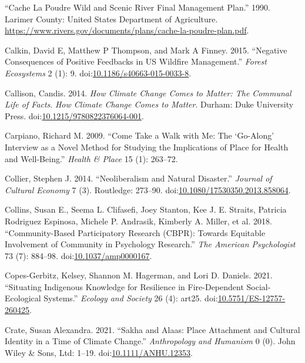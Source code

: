 \documentclass[
]{article}
\newlength{\cslhangindent}
\newenvironment{CSLReferences}[2] %
 {\begin{list}{}{%
  \setlength{\itemindent}{0pt}
  \setlength{\leftmargin}{0pt}
  \setlength{\parsep}{0pt}
  \ifodd #1
   \setlength{\leftmargin}{\cslhangindent}
   \setlength{\itemindent}{-1\cslhangindent}
  \fi
  \setlength{\itemsep}{#2\baselineskip}}}
 {\end{list}}
\begin{document}
\begin{CSLReferences}{1}{0}
{``Cache {La Poudre Wild} and {Scenic River Final Management Plan}.''} 1990. Larimer County: United States Department of Agriculture. \url{https://www.rivers.gov/documents/plans/cache-la-poudre-plan.pdf}.

Calkin, David E, Matthew P Thompson, and Mark A Finney. 2015. {``Negative Consequences of Positive Feedbacks in {US} Wildfire Management.''} \emph{Forest Ecosystems} 2 (1): 9. doi:\href{https://doi.org/10.1186/s40663-015-0033-8}{10.1186/s40663-015-0033-8}.

Callison, Candis. 2014. \emph{How Climate Change Comes to Matter: {The Communal Life} of {Facts}}. \emph{How Climate Change Comes to Matter}. Durham: Duke University Press. doi:\href{https://doi.org/10.1215/9780822376064-001}{10.1215/9780822376064-001}.

Carpiano, Richard M. 2009. {``Come Take a Walk with Me: {The} {`{Go-Along}'} Interview as a Novel Method for Studying the Implications of Place for Health and Well-Being.''} \emph{Health \& Place} 15 (1): 263--72.

Collier, Stephen J. 2014. {``Neoliberalism and {Natural Disaster}.''} \emph{Journal of Cultural Economy} 7 (3). Routledge: 273--90. doi:\href{https://doi.org/10.1080/17530350.2013.858064}{10.1080/17530350.2013.858064}.

Collins, Susan E., Seema L. Clifasefi, Joey Stanton, Kee J. E. Straits, Patricia Rodriguez Espinosa, Michele P. Andrasik, Kimberly A. Miller, et al. 2018. {``Community-Based {Participatory Research} ({CBPR}): {Towards Equitable Involvement} of {Community} in {Psychology Research}.''} \emph{The American Psychologist} 73 (7): 884--98. doi:\href{https://doi.org/10.1037/amp0000167}{10.1037/amp0000167}.

Copes-Gerbitz, Kelsey, Shannon M. Hagerman, and Lori D. Daniels. 2021. {``Situating {Indigenous} Knowledge for Resilience in Fire-Dependent Social-Ecological Systems.''} \emph{Ecology and Society} 26 (4): art25. doi:\href{https://doi.org/10.5751/ES-12757-260425}{10.5751/ES-12757-260425}.

Crate, Susan Alexandra. 2021. {``Sakha and {Alaas}: {Place Attachment} and {Cultural Identity} in a {Time} of {Climate Change}.''} \emph{Anthropology and Humanism} 0 (0). John Wiley \& Sons, Ltd: 1--19. doi:\href{https://doi.org/10.1111/ANHU.12353}{10.1111/ANHU.12353}.


\end{CSLReferences}
\end{document}
